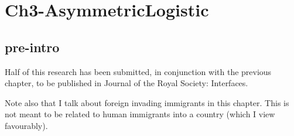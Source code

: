\chapter{Ch3-AsymmetricLogistic}




\section{pre-intro}%
Half of this research has been submitted, in conjunction with the previous chapter, to be published in Journal of the Royal Society: Interfaces. 

Note also that I talk about foreign invading immigrants in this chapter. This is not meant to be related to human immigrants into a country (which I view favourably). 


